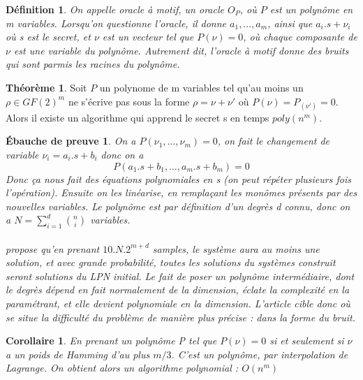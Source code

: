 \documentclass{article}		%
\newtheorem{defi}{Définition}
\theoremstyle{definition}
\newtheorem{theo}{Théorème}
\theoremstyle{plain}
\newtheorem{intui}{Ébauche de preuve}
\theoremstyle{plain}
\newtheorem{coro}{Corollaire}
\theoremstyle{plain}
\theoremstyle{plain}
\theoremstyle{plain}
\begin{document}
\begin{framed}
\begin{defi}
On appelle oracle à motif, un oracle $O_P$, où $P$ est un polynôme en m
variables. Lorsqu'on questionne l'oracle, il donne $a_1, \dots, a_m$,
ainsi que $a_i.s+\nu_i$ où s est le secret, et $\nu$ est un vecteur tel
que $P(\nu)=0$, où chaque composante de $\nu$ est une variable du
polynôme. Autrement dit, l'oracle à motif donne des bruits qui sont
parmis les racines du polynôme.
\end{defi}

\begin{theo}
Soit $P$ un polynome de m variables tel qu'au moins un $\rho\in GF(2)^m$
ne s'écrive pas sous la forme $\rho=\nu + \nu'$ où $P(\nu)=P_(\nu')=0$.
Alors il existe un algorithme qui apprend le secret s en temps
$poly(n^m)$.
\end{theo}

\begin{intui}
On a $P(\nu_1,\dots,\nu_m)=0$, on fait le changement de variable
$\nu_i=a_i.s+b_i$ donc on a 
$$P(a_1.s+b_1, \dots, a_m.s+b_m)=0$$
Donc ça nous fait des équations polynomiales en s (on peut répéter
plusieurs fois l'opération). Ensuite on les
linéarise, en remplaçant les monômes présents par des nouvelles
variables. Le polynôme est par définition d'un degrès d connu, donc on a
$N=\sum_{i=1}^d \binom{n}{i}$ variables.
\\\\
\cite{Arora} propose qu'en prenant $10.N.2^{m+d}$ samples, le système
aura au moins une solution, et avec grande probabilité, toutes les
solutions du systèmes construit seront solutions du LPN initial.
Le fait de poser un polynôme intermédiaire, dont le degrès dépend en fait
normalement
de la dimension, éclate la complexité en la paramétrant, et elle devient
polynomiale en la dimension. L'article cible donc où se situe la
difficulté du problème de manière plus précise : dans la forme du bruit. 
\end{intui}
 
\begin{coro}
En prenant un polynôme P tel que $P(\nu)=0$ si et seulement si $\nu$ a un
poids de Hamming d'au plus $m/3$. C'est un polynôme, par interpolation de
Lagrange. On obtient alors un algorithme
polynomial : $O(n^m)$
\end{coro}
\end{framed}
\end{document}
